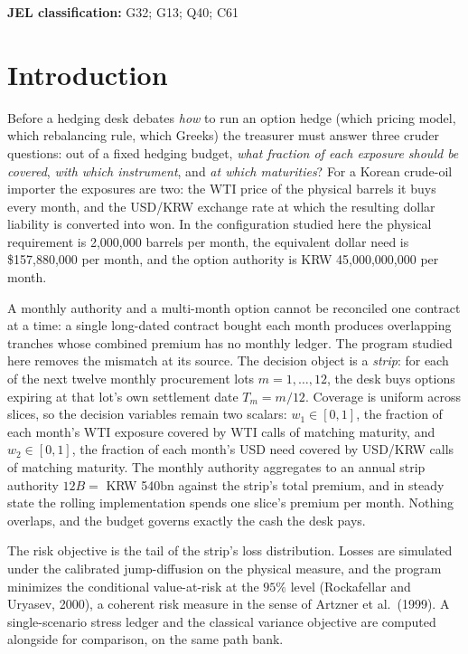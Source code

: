 \documentclass[11pt,a4paper]{article}
\begin{document}
\vspace{0.3em}
\noindent\textbf{JEL classification:} G32; G13; Q40; C61

\tableofcontents
\newpage

\section{Introduction}

Before a hedging desk debates \emph{how} to run an option hedge (which pricing model, which rebalancing rule, which Greeks) the treasurer must answer three cruder questions: out of a fixed hedging budget, \emph{what fraction of each exposure should be covered}, \emph{with which instrument}, and \emph{at which maturities}? For a Korean crude-oil importer the exposures are two: the WTI price of the physical barrels it buys every month, and the USD/KRW exchange rate at which the resulting dollar liability is converted into won. In the configuration studied here the physical requirement is 2{,}000{,}000 barrels per month, the equivalent dollar need is \$157{,}880{,}000 per month, and the option authority is KRW 45{,}000{,}000{,}000 per month.

A monthly authority and a multi-month option cannot be reconciled one contract at a time: a single long-dated contract bought each month produces overlapping tranches whose combined premium has no monthly ledger. The program studied here removes the mismatch at its source. The decision object is a \emph{strip}: for each of the next twelve monthly procurement lots $m=1,\dots,12$, the desk buys options expiring at that lot's own settlement date $T_m=m/12$. Coverage is uniform across slices, so the decision variables remain two scalars: $w_1\in[0,1]$, the fraction of each month's WTI exposure covered by WTI calls of matching maturity, and $w_2\in[0,1]$, the fraction of each month's USD need covered by USD/KRW calls of matching maturity. The monthly authority aggregates to an annual strip authority $12B=$ KRW 540bn against the strip's total premium, and in steady state the rolling implementation spends one slice's premium per month. Nothing overlaps, and the budget governs exactly the cash the desk pays.

The risk objective is the tail of the strip's loss distribution. Losses are simulated under the calibrated jump-diffusion on the physical measure, and the program minimizes the conditional value-at-risk at the $95\%$ level (Rockafellar and Uryasev, 2000), a coherent risk measure in the sense of Artzner et al.\ (1999). A single-scenario stress ledger and the classical variance objective are computed alongside for comparison, on the same path bank.
\end{document}
